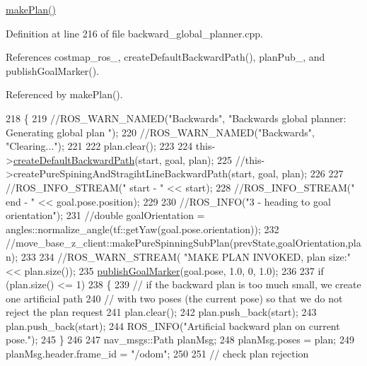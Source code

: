 \hyperlink{classmove__base__z__client_1_1backward__global__planner_1_1BackwardGlobalPlanner_af9441c1bd8d258281458ca7fa012e0e6}{make\+Plan()} 

Definition at line 216 of file backward\+\_\+global\+\_\+planner.\+cpp.



References costmap\+\_\+ros\+\_\+, create\+Default\+Backward\+Path(), plan\+Pub\+\_\+, and publish\+Goal\+Marker().



Referenced by make\+Plan().


\begin{DoxyCode}
218 \{
219     \textcolor{comment}{//ROS\_WARN\_NAMED("Backwards", "Backwards global planner: Generating global plan ");}
220     \textcolor{comment}{//ROS\_WARN\_NAMED("Backwards", "Clearing...");}
221 
222     plan.clear();
223 
224     this->\hyperlink{classmove__base__z__client_1_1backward__global__planner_1_1BackwardGlobalPlanner_a395d7f10f5e8dfb26fe9809912f29795}{createDefaultBackwardPath}(start, goal, plan);
225     \textcolor{comment}{//this->createPureSpiningAndStragihtLineBackwardPath(start, goal, plan);}
226 
227     \textcolor{comment}{//ROS\_INFO\_STREAM(" start - " << start);}
228     \textcolor{comment}{//ROS\_INFO\_STREAM(" end - " << goal.pose.position);}
229 
230     \textcolor{comment}{//ROS\_INFO("3 - heading to goal orientation");}
231     \textcolor{comment}{//double goalOrientation = angles::normalize\_angle(tf::getYaw(goal.pose.orientation));}
232     \textcolor{comment}{//move\_base\_z\_client::makePureSpinningSubPlan(prevState,goalOrientation,plan);}
233 
234     \textcolor{comment}{//ROS\_WARN\_STREAM( "MAKE PLAN INVOKED, plan size:"<< plan.size());}
235     \hyperlink{classmove__base__z__client_1_1backward__global__planner_1_1BackwardGlobalPlanner_adefb1127aa2a4f9c487763aea3817864}{publishGoalMarker}(goal.pose, 1.0, 0, 1.0);
236 
237     \textcolor{keywordflow}{if} (plan.size() <= 1)
238     \{
239         \textcolor{comment}{// if the backward plan is too much small, we create one artificial path}
240         \textcolor{comment}{// with two poses (the current pose) so that we do not reject the plan request        }
241         plan.clear();
242         plan.push\_back(start);
243         plan.push\_back(start);
244         ROS\_INFO(\textcolor{stringliteral}{"Artificial backward plan on current pose."});
245     \}
246 
247     nav\_msgs::Path planMsg;
248     planMsg.poses = plan;
249     planMsg.header.frame\_id = \textcolor{stringliteral}{"/odom"};
250 
251         \textcolor{comment}{// check plan rejection}

\end{DoxyCode}
